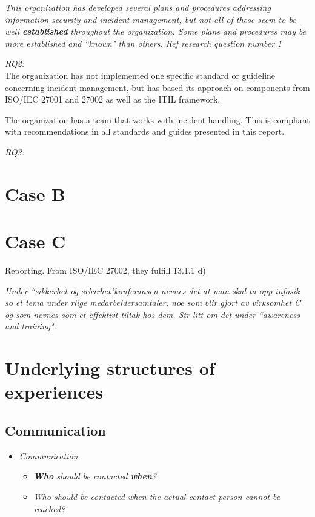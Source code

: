 \textit{This organization has developed several plans and procedures addressing information security and incident management, but not all of these seem to be well \textbf{established} throughout the organization. Some plans and procedures may be more established and ``known" than others. Ref research question number 1}

\textit{RQ2:}\\
The organization has not implemented one specific standard or guideline concerning incident management, but has based its approach on components from ISO/IEC 27001 and 27002 as well as the \ac{ITIL} framework. 

The organization has a team that works with incident handling. This is compliant with recommendations in all standards and guides presented in this report.

\textit{RQ3:}\\

\section{Case B}

\section{Case C}

Reporting. From ISO/IEC 27002, they fulfill 13.1.1 d)

\textit{Under ``sikkerhet og srbarhet"konferansen nevnes det at man skal ta opp infosik so et tema under rlige medarbeidersamtaler, noe som blir gjort av virksomhet C og som nevnes som et effektivt tiltak hos dem. Str litt om det under ``awareness and training".}

\section{Underlying structures of experiences}
\subsection{Communication}
\begin{itemize}
\item \textit{Communication}
\begin{itemize}
\item \textit{\textbf{Who} should be contacted \textbf{when}?}
\item \textit{Who should be contacted when the actual contact person cannot be reached?}
\end{itemize}
\end{itemize}

